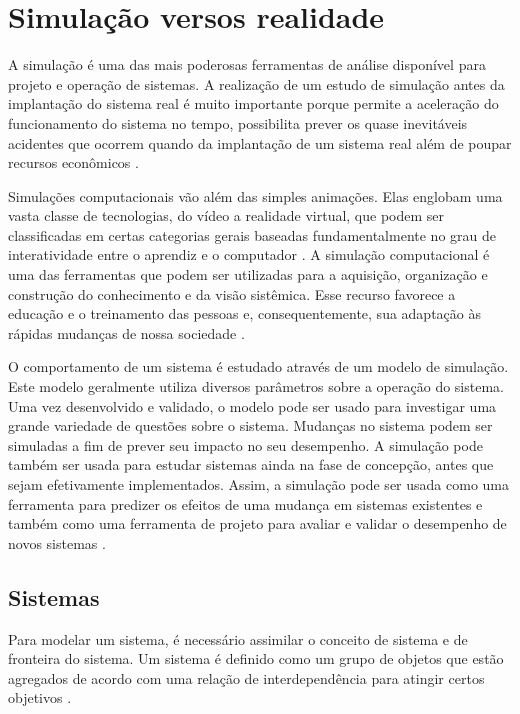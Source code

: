 

\section{Simulação versos realidade}

A simulação é uma das mais poderosas ferramentas de análise disponível para projeto e operação de sistemas. A realização de um estudo de simulação antes da implantação do sistema real é muito importante porque permite a aceleração do funcionamento do sistema no tempo, possibilita prever os quase inevitáveis acidentes que ocorrem quando da implantação de um sistema real além de poupar recursos econômicos \cite{lobao1999evoluccao}.

Simulações computacionais vão além das simples animações. Elas englobam uma vasta classe de tecnologias, do vídeo a realidade virtual, que podem ser classificadas em certas categorias gerais baseadas fundamentalmente no grau de interatividade entre o aprendiz e o computador \cite{gaddis2000learning}. A simulação computacional é uma das ferramentas que podem ser utilizadas para a aquisição, organização e construção do conhecimento e da visão sistêmica. Esse recurso favorece a educação e o treinamento das pessoas e, consequentemente, sua adaptação às rápidas mudanças de nossa sociedade \cite{de2014simulaccao}.

O comportamento de um sistema é estudado através de um modelo de simulação. Este modelo geralmente utiliza diversos parâmetros sobre a operação do sistema. Uma vez desenvolvido e validado, o modelo pode ser usado para investigar uma grande variedade de questões sobre o sistema. Mudanças no sistema podem ser simuladas a fim de prever seu impacto no seu desempenho. A simulação pode também ser usada para estudar sistemas ainda na fase de concepção, antes que sejam efetivamente implementados. Assim, a simulação pode ser usada como uma ferramenta para predizer os efeitos de uma mudança em sistemas existentes e também como uma ferramenta de projeto para avaliar e validar o desempenho de novos sistemas \cite{miyagi2006introduccao}.

\subsection{Sistemas}

Para modelar um sistema, é necessário assimilar o conceito de sistema e de fronteira do sistema. Um sistema é definido como um grupo de objetos que estão agregados de acordo com uma relação de interdependência para atingir certos objetivos \cite{miyagi2006introduccao}. 

